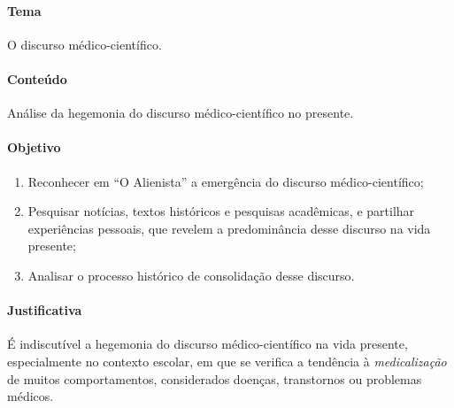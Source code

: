 \documentclass{extarticle}
\begin{document}

\paragraph{Tema} O discurso médico-científico.

\paragraph{Conteúdo} Análise da hegemonia do discurso médico-científico no
presente.

\paragraph{Objetivo}
\begin{enumerate} 
\item Reconhecer em ``O Alienista'' a emergência do
discurso médico-científico; 

\item Pesquisar notícias, textos históricos e
pesquisas acadêmicas, e partilhar experiências pessoais, que revelem a
predominância desse discurso na vida presente; 

\item Analisar o processo
histórico de consolidação desse discurso.
\end{enumerate}

\paragraph{Justificativa} É indiscutível a hegemonia do discurso
médico-científico na vida presente, especialmente no contexto escolar,
em que se verifica a tendência à \emph{medicalização} de muitos
comportamentos, considerados doenças, transtornos ou problemas médicos.
\end{document}
